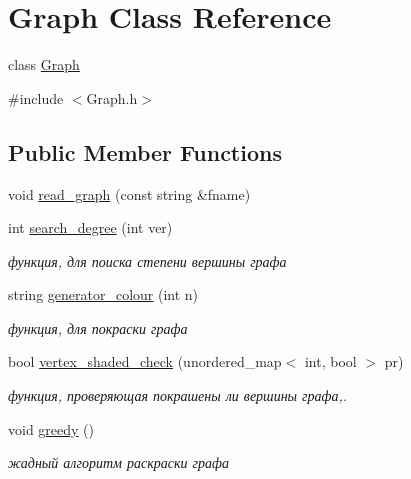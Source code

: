 \hypertarget{class_graph}{}\section{Graph Class Reference}
\label{class_graph}


class \mbox{\hyperlink{class_graph}{Graph}}  




{\ttfamily \#include $<$Graph.\+h$>$}

\subsection*{Public Member Functions}
\begin{DoxyCompactItemize}
\item 
void \mbox{\hyperlink{class_graph_a616456b0910e93422493040d35b06239}{read\+\_\+graph}} (const string \&fname)
\item 
int \mbox{\hyperlink{class_graph_a15aa3f0cf781e6401b770386b3806bc2}{search\+\_\+degree}} (int ver)
\begin{DoxyCompactList}\small\item\em функция, для поиска степени вершины графа \end{DoxyCompactList}\item 
string \mbox{\hyperlink{class_graph_aef156ae0e0d14b85f46eaa01d8348c0f}{generator\+\_\+colour}} (int n)
\begin{DoxyCompactList}\small\item\em функция, для покраски графа \end{DoxyCompactList}\item 
bool \mbox{\hyperlink{class_graph_a2ed0d56928f1a12a9aaada8e5d1cc77f}{vertex\+\_\+shaded\+\_\+check}} (unordered\+\_\+map$<$ int, bool $>$ pr)
\begin{DoxyCompactList}\small\item\em функция, проверяющая покрашены ли вершины графа,. \end{DoxyCompactList}\item 
\mbox{\label{class_graph_a1b371a313cf7e943139cceda71711e25}} 
void \mbox{\hyperlink{class_graph_a1b371a313cf7e943139cceda71711e25}{greedy}} ()
\begin{DoxyCompactList}\small\item\em жадный алгоритм раскраски графа \end{DoxyCompactList}\item 
\mbox{\label{class_graph_abb07f9a9f1852e996b388160481f975c}} 

\end{DoxyCompactItemize}
